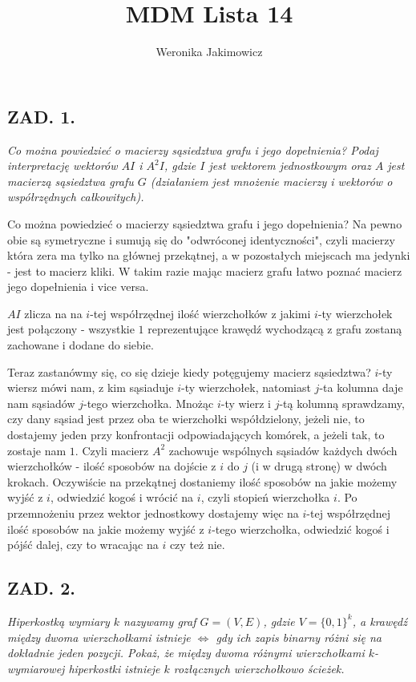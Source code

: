 \documentclass{article}
\author{Weronika Jakimowicz}
\title{MDM Lista 14}
\date{}
\begin{document}
\maketitle
\thispagestyle{empty}

\subsection*{ZAD. 1.}
\emph{Co można powiedzieć o macierzy sąsiedztwa grafu i jego dopełnienia? Podaj interpretację wektorów $AI$ i $A^2I$, gdzie $I$ jest wektorem jednostkowym oraz $A$ jest macierzą sąsiedztwa grafu $G$ (działaniem jest mnożenie macierzy i wektorów o współrzędnych całkowitych).}
\medskip

\medskip

Co można powiedzieć o macierzy sąsiedztwa grafu i jego dopełnienia? Na pewno obie są symetryczne i sumują się do "odwróconej identyczności", czyli macierzy która zera ma tylko na głównej przekątnej, a w pozostałych miejscach ma jedynki - jest to macierz kliki. W takim razie mając macierz grafu łatwo poznać macierz jego dopełnienia i vice versa.
\smallskip

$AI$ zlicza na na $i$-tej współrzędnej ilość wierzchołków z jakimi $i$-ty wierzchołek jest połączony - wszystkie $1$ reprezentujące krawędź wychodzącą z grafu zostaną zachowane i dodane do siebie.
\smallskip

Teraz zastanówmy się, co się dzieje kiedy potęgujemy macierz sąsiedztwa? $i$-ty wiersz mówi nam, z kim sąsiaduje $i$-ty wierzchołek, natomiast $j$-ta kolumna daje nam sąsiadów $j$-tego wierzchołka. Mnożąc $i$-ty wierz i $j$-tą kolumną sprawdzamy, czy dany sąsiad jest przez oba te wierzchołki współdzielony, jeżeli nie, to dostajemy jeden przy konfrontacji odpowiadających komórek, a jeżeli tak, to zostaje nam $1$. Czyli macierz $A^2$ zachowuje wspólnych sąsiadów każdych dwóch wierzchołków - ilość sposobów na dojście z $i$ do $j$ (i w drugą stronę) w dwóch krokach. Oczywiście na przekątnej dostaniemy ilość sposobów na jakie możemy wyjść z $i$, odwiedzić kogoś i wrócić na $i$, czyli stopień wierzchołka $i$. Po przemnożeniu przez wektor jednostkowy dostajemy więc na $i$-tej współrzędnej ilość sposobów na jakie możemy wyjść z $i$-tego wierzchołka, odwiedzić kogoś i pójść dalej, czy to wracając na $i$ czy też nie.

\subsection*{ZAD. 2.}
\emph{Hiperkostką wymiary $k$ nazywamy graf $G=(V, E)$, gdzie $V=\{0,1\}^k$, a krawędź między dwoma wierzchołkami istnieje $\iff$ gdy ich zapis binarny różni się na dokładnie jeden pozycji. Pokaż, że między dwoma różnymi wierzchołkami $k$-wymiarowej hiperkostki istnieje $k$ rozłącznych wierzchołkowo ścieżek.}
\medskip
\end{document}
